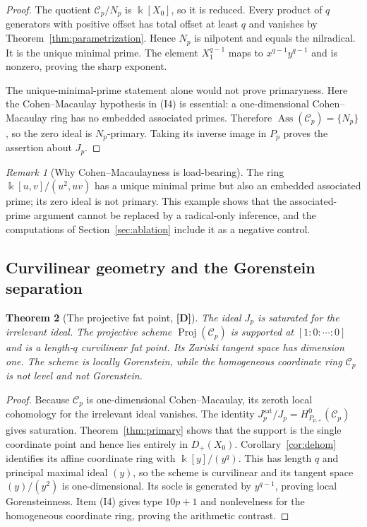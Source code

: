 \documentclass[11pt]{article}
\newtheorem{theorem}{Theorem}[section]
\theoremstyle{definition}
\theoremstyle{remark}
\newtheorem{remark}[theorem]{Remark}
\newcommand{\kfield}{\Bbbk}
\newcommand{\Cfiber}{\mathcal{C}}
\newcommand{\mD}{\textbf{[D]}}
\begin{document}
\begin{proof}
The quotient $\Cfiber_p/N_p$ is $\kfield[X_0]$, so it is reduced. Every product of $q$ generators
with positive offset has total offset at least $q$ and vanishes by
Theorem~\ref{thm:parametrization}. Hence $N_p$ is nilpotent and equals the nilradical. It is the
unique minimal prime. The element $X_1^{q-1}$ maps to $x^{q-1}y^{q-1}$ and is nonzero, proving
the sharp exponent.

The unique-minimal-prime statement alone would not prove primaryness. Here the
Cohen--Macaulay hypothesis in (I4) is essential: a one-dimensional Cohen--Macaulay ring has no
embedded associated primes. Therefore $\operatorname{Ass}(\Cfiber_p)=\{N_p\}$, so the zero ideal
is $N_p$-primary. Taking its inverse image in $P_p$ proves the assertion about $J_p$.
\end{proof}

\begin{remark}[Why Cohen--Macaulayness is load-bearing]
The ring $\kfield[u,v]/(u^2,uv)$ has a unique minimal prime but also an embedded associated
prime; its zero ideal is not primary. This example shows that the associated-prime argument
cannot be replaced by a radical-only inference, and the computations of
Section~\ref{sec:ablation} include it as a negative control.
\end{remark}

\subsection{Curvilinear geometry and the Gorenstein separation}

\begin{theorem}[The projective fat point, \mD]\label{thm:geometry}
The ideal $J_p$ is saturated for the irrelevant ideal. The projective scheme
$\operatorname{Proj}(\Cfiber_p)$ is supported at $[1:0:\cdots:0]$ and is a length-$q$
curvilinear fat point. Its Zariski tangent space has dimension one. The scheme is locally
Gorenstein, while the homogeneous coordinate ring $\Cfiber_p$ is not level and not Gorenstein.
\end{theorem}

\begin{proof}
Because $\Cfiber_p$ is one-dimensional Cohen--Macaulay, its zeroth local cohomology for the
irrelevant ideal vanishes. The identity
$J_p^{\mathrm{sat}}/J_p=H^0_{P_{p,+}}(\Cfiber_p)$ gives saturation. Theorem~\ref{thm:primary}
shows that the support is the single coordinate point and hence lies entirely in $D_+(X_0)$.
Corollary~\ref{cor:dehom} identifies its affine coordinate ring with $\kfield[y]/(y^q)$. This
has length $q$ and principal maximal ideal $(y)$, so the scheme is curvilinear and its tangent
space $(y)/(y^2)$ is one-dimensional. Its socle is generated by $y^{q-1}$, proving local
Gorensteinness. Item (I4) gives type $10p+1$ and nonlevelness for the homogeneous coordinate
ring, proving the arithmetic contrast.
\end{proof}
\end{document}
